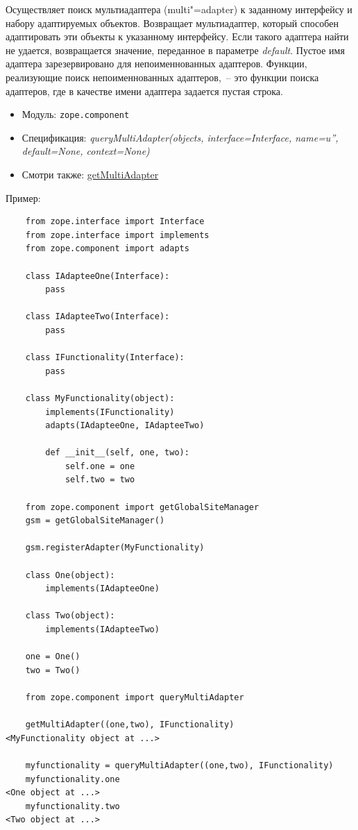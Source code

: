 \documentclass[a4paper,openany,twoside,final]{book}
\providecommand*{\DUroletitlereference}[1]{\textsl{#1}}
\begin{document}
Осуществляет поиск мультиадаптера (multi"=adapter) к заданному интерфейсу и набору адаптируемых объектов.  Возвращает мультиадаптер, который способен адаптировать эти объекты к указанному интерфейсу.  Если такого адаптера найти не удается, возвращается значение, переданное в параметре \DUroletitlereference{default}.  Пустое имя адаптера зарезервировано для непоименнованных адаптеров.  Функции, реализующие поиск непоименнованных адаптеров,~-- это функции поиска адаптеров, где в качестве имени адаптера задается пустая строка.

\begin{itemize}

\item Модуль: \texttt{zope.component}

\item Спецификация: \DUroletitlereference{queryMultiAdapter(objects, interface=Interface, name=u'', default=None, context=None)}

\item Смотри также: \hyperref[getmultiadapter]{getMultiAdapter}

\end{itemize}

Пример:

\begin{verbatim}
    from zope.interface import Interface
    from zope.interface import implements
    from zope.component import adapts

    class IAdapteeOne(Interface):
        pass

    class IAdapteeTwo(Interface):
        pass

    class IFunctionality(Interface):
        pass

    class MyFunctionality(object):
        implements(IFunctionality)
        adapts(IAdapteeOne, IAdapteeTwo)

        def __init__(self, one, two):
            self.one = one
            self.two = two

    from zope.component import getGlobalSiteManager
    gsm = getGlobalSiteManager()

    gsm.registerAdapter(MyFunctionality)

    class One(object):
        implements(IAdapteeOne)

    class Two(object):
        implements(IAdapteeTwo)

    one = One()
    two = Two()

    from zope.component import queryMultiAdapter

    getMultiAdapter((one,two), IFunctionality)
<MyFunctionality object at ...>

    myfunctionality = queryMultiAdapter((one,two), IFunctionality)
    myfunctionality.one
<One object at ...>
    myfunctionality.two
<Two object at ...>
\end{verbatim}
\end{document}
